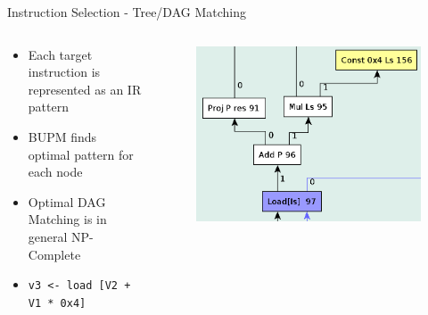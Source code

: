 \documentclass[en,16:9]{sdqbeamer}
\begin{document}
\begin{frame}{Instruction Selection - Tree/DAG Matching}
	\begin{columns}
		\begin{column}{0.5\textwidth}
			\begin{itemize}
				\item Each target instruction is represented as an IR pattern
				\item BUPM finds optimal pattern for each node
				\item Optimal DAG Matching is in general NP-Complete
				\vspace{2em}
				\item \texttt{v3 <- load [V2 + V1 * 0x4]}
			\end{itemize}
		\end{column}

		\begin{column}{0.5\textwidth}
			\begin{figure}
				\centering
				\includegraphics[scale=0.3]{images/instruction-selection.png}
			\end{figure}
		\end{column}
	\end{columns}
\end{frame}
\end{document}
